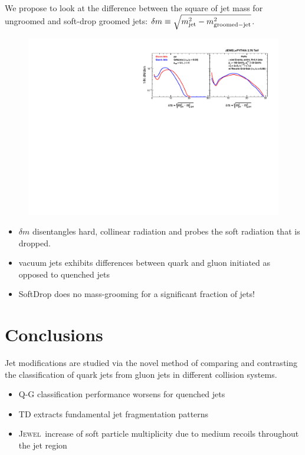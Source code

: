\documentclass[final]{beamer}
\newcommand{\jw}{\textsc{Jewel}~}
\begin{document}
\begin{frame}[t]
\begin{multicols}{3}
	We propose to look at the difference between the square of jet mass for ungroomed and soft-drop groomed jets: $\delta m \equiv \sqrt{m_{\rm jet}^2-m_{\rm groomed-jet}^2}$. 
	\begin{figure}[t]
	   \centering
	   \includegraphics[width=0.9\columnwidth]{Figures/deltaMPrediction.pdf}
	   \label{fig:comp_delta_m2}
	\end{figure}
		
	\begin{itemize}
	\item $\delta m$ disentangles hard, collinear radiation and probes the soft radiation that is dropped. 
	\item vacuum jets exhibits differences between quark and gluon initiated as opposed to quenched jets 
	\item SoftDrop does no mass-grooming for a significant fraction of jets! 
	\end{itemize}
	
\section{Conclusions}
Jet modifications are studied via the novel method of comparing and contrasting the classification of quark jets from gluon jets in different collision systems.
	\begin{itemize}
	\item Q-G classification performance worsens for quenched jets
	\item TD extracts fundamental jet fragmentation patterns 
	\item \jw increase of soft particle multiplicity due to medium recoils throughout the jet region
	\end{itemize}


\end{multicols}
\end{frame}
\end{document}
